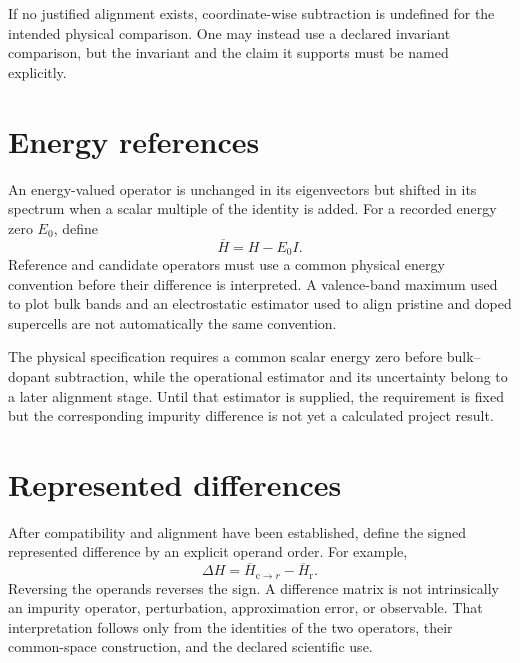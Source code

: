 If no justified alignment exists, coordinate-wise subtraction is undefined for
the intended physical comparison. One may instead use a declared invariant
comparison, but the invariant and the claim it supports must be named
explicitly.

\section{Energy references}


An energy-valued operator is unchanged in its eigenvectors but shifted in its
spectrum when a scalar multiple of the identity is added. For a recorded energy
zero $E_0$, define
\begin{equation}
  \overline H=H-E_0I.
\end{equation}
Reference and candidate operators must use a common physical energy convention
before their difference is interpreted. A valence-band maximum used to plot
bulk bands and an electrostatic estimator used to align pristine and doped
supercells are not automatically the same convention.

The physical specification requires a common scalar energy zero before
bulk--dopant subtraction, while the operational estimator and its uncertainty
belong to a later alignment stage. Until that estimator is supplied, the
requirement is fixed but the corresponding impurity difference is not yet a
calculated project result.


\section{Represented differences}


After compatibility and alignment have been established, define the signed
represented difference by an explicit operand order. For example,
\begin{equation}
  \Delta H
  =
  \overline H_{\mathrm c\rightarrow r}
  -
  \overline H_{\mathrm r}.
\end{equation}
Reversing the operands reverses the sign. A difference matrix is not
intrinsically an impurity operator, perturbation, approximation error, or
observable. That interpretation follows only from the identities of the two
operators, their common-space construction, and the declared scientific use.

